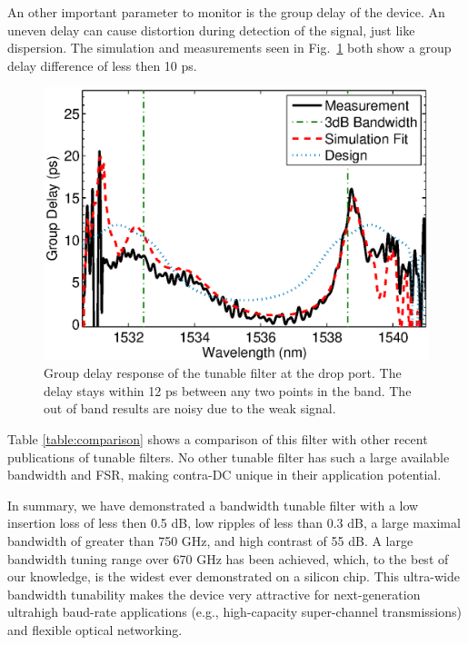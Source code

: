 \documentclass[9pt,twocolumn,twoside]{osajnl}
\begin{document}
An other important parameter to monitor is the group delay of the device. An uneven delay can cause distortion during detection of the signal, just like dispersion. The simulation and measurements seen in Fig.~\ref{fig:phase} both show a group delay difference of less then 10 ps.
\begin{figure}[tbp]
\centering
\includegraphics[width=.99\columnwidth]{data/Phase2}
\caption{ Group delay response of the tunable filter at the drop port. The delay stays within 12 ps between any two points in the band. The out of band results are noisy due to the weak signal.}
\label{fig:phase}
\end{figure}

Table \ref{table:comparison} shows a comparison of this filter with other recent publications of tunable filters. No other tunable filter has such a large available bandwidth and FSR, making contra-DC unique in their application potential.


In summary, we have demonstrated a bandwidth tunable filter with a low insertion loss of less then 0.5 dB, low ripples of less than 0.3 dB, a large maximal bandwidth of greater than 750 GHz, and high contrast of 55 dB. 
A large bandwidth tuning range over 670 GHz has been achieved, which, to the best of our knowledge, is the widest ever demonstrated on a silicon chip. 
This ultra-wide bandwidth tunability makes the device very attractive for next-generation ultrahigh baud-rate applications (e.g., high-capacity super-channel transmissions) and flexible optical networking. 
\end{document}
